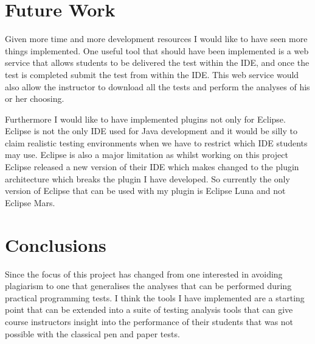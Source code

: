 \documentclass[twocolumn]{article}
\begin{document}
\section{Future Work}
Given more time and more development resources I would like to have seen more
things implemented. One useful tool that should have been implemented is a web
service that allows students to be delivered the test within the IDE, and once
the test is completed submit the test from within the IDE. This web service
would also allow the instructor to download all the tests and perform the
analyses of his or her choosing.

Furthermore I would like to have implemented plugins not only for Eclipse.
Eclipse is not the only IDE used for Java development and it would be silly to
claim realistic testing environments when we have to restrict which IDE
students may use. Eclipse is also a major limitation as whilst working on this
project Eclipse released a new version of their IDE which makes changed to the
plugin architecture which breaks the plugin I have developed. So currently the
only version of Eclipse that can be used with my plugin is Eclipse Luna and not
Eclipse Mars.


\section{Conclusions}
Since the focus of this project has changed from one interested in avoiding
plagiarism to one that generalises the analyses that can be performed during
practical programming tests. I think the tools I have implemented are a
starting point that can be extended into a suite of testing analysis tools that
can give course instructors insight into the performance of their students that
was not possible with the classical pen and paper tests.



\end{document}
